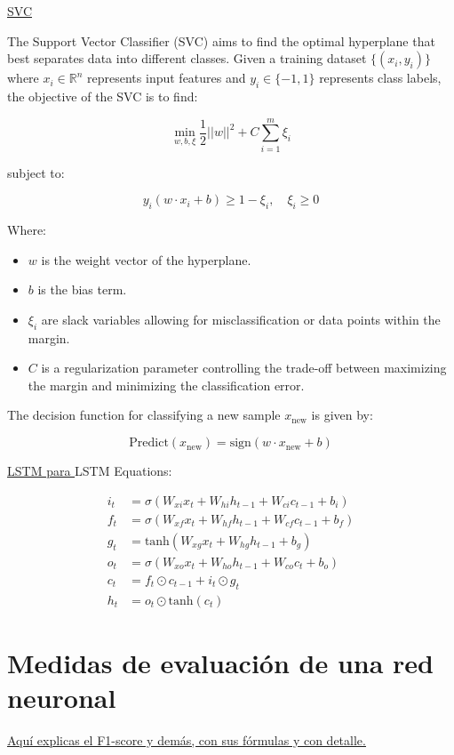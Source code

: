 \documentclass{uathesis-es}
\begin{document}
{\underline{SVC}

The Support Vector Classifier (SVC) aims to find the optimal hyperplane that best separates data into different classes. Given a training dataset $\{(x_i, y_i)\}$ where $x_i \in \mathbb{R}^n$ represents input features and $y_i \in \{-1, 1\}$ represents class labels, the objective of the SVC is to find:

\[
\min_{w, b, \xi} \frac{1}{2} ||w||^2 + C \sum_{i=1}^{m} \xi_i
\]

subject to:

\[
y_i(w \cdot x_i + b) \geq 1 - \xi_i, \quad \xi_i \geq 0
\]

Where:
\begin{itemize}
    \item $w$ is the weight vector of the hyperplane.
    \item $b$ is the bias term.
    \item $\xi_i$ are slack variables allowing for misclassification or data points within the margin.
    \item $C$ is a regularization parameter controlling the trade-off between maximizing the margin and minimizing the classification error.
\end{itemize}

The decision function for classifying a new sample $x_{\text{new}}$ is given by:

\[
\text{Predict}(x_{\text{new}}) = \text{sign}(w \cdot x_{\text{new}} + b)
\]

\underline{LSTM para \cite{app7060476}}
LSTM Equations:

\begin{align*}
i_t &= \sigma(W_{xi}x_t + W_{hi}h_{t-1} + W_{ci}c_{t-1} + b_i) \\
f_t &= \sigma(W_{xf}x_t + W_{hf}h_{t-1} + W_{cf}c_{t-1} + b_f) \\
g_t &= \text{tanh}(W_{xg}x_t + W_{hg}h_{t-1} + b_g) \\
o_t &= \sigma(W_{xo}x_t + W_{ho}h_{t-1} + W_{co}c_{t} + b_o) \\
c_t &= f_t \odot c_{t-1} + i_t \odot g_t \\
h_t &= o_t \odot \text{tanh}(c_t)
\end{align*}
}


\section{Medidas de evaluación de una red neuronal}
\underline{Aquí explicas el F1-score y demás, con sus fórmulas y con detalle.}
\end{document}
